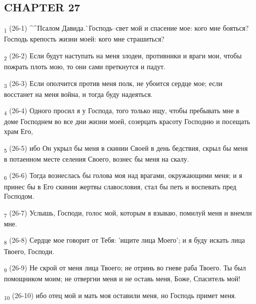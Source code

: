 \subsection{CHAPTER 27}
\begin{tcolorbox}
\textsubscript{1} (26-1) ^^Псалом Давида.^^ Господь--свет мой и спасение мое: кого мне бояться? Господь крепость жизни моей: кого мне страшиться?
\end{tcolorbox}
\begin{tcolorbox}
\textsubscript{2} (26-2) Если будут наступать на меня злодеи, противники и враги мои, чтобы пожрать плоть мою, то они сами преткнутся и падут.
\end{tcolorbox}
\begin{tcolorbox}
\textsubscript{3} (26-3) Если ополчится против меня полк, не убоится сердце мое; если восстанет на меня война, и тогда буду надеяться.
\end{tcolorbox}
\begin{tcolorbox}
\textsubscript{4} (26-4) Одного просил я у Господа, того только ищу, чтобы пребывать мне в доме Господнем во все дни жизни моей, созерцать красоту Господню и посещать храм Его,
\end{tcolorbox}
\begin{tcolorbox}
\textsubscript{5} (26-5) ибо Он укрыл бы меня в скинии Своей в день бедствия, скрыл бы меня в потаенном месте селения Своего, вознес бы меня на скалу.
\end{tcolorbox}
\begin{tcolorbox}
\textsubscript{6} (26-6) Тогда вознеслась бы голова моя над врагами, окружающими меня; и я принес бы в Его скинии жертвы славословия, стал бы петь и воспевать пред Господом.
\end{tcolorbox}
\begin{tcolorbox}
\textsubscript{7} (26-7) Услышь, Господи, голос мой, которым я взываю, помилуй меня и внемли мне.
\end{tcolorbox}
\begin{tcolorbox}
\textsubscript{8} (26-8) Сердце мое говорит от Тебя: 'ищите лица Моего'; и я буду искать лица Твоего, Господи.
\end{tcolorbox}
\begin{tcolorbox}
\textsubscript{9} (26-9) Не скрой от меня лица Твоего; не отринь во гневе раба Твоего. Ты был помощником моим; не отвергни меня и не оставь меня, Боже, Спаситель мой!
\end{tcolorbox}
\begin{tcolorbox}
\textsubscript{10} (26-10) ибо отец мой и мать моя оставили меня, но Господь примет меня.
\end{tcolorbox}
